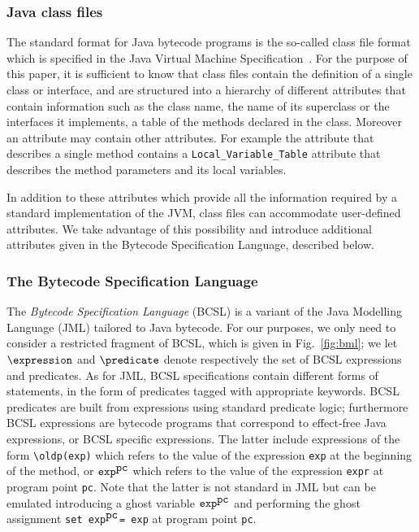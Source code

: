\subsubsection{Java class files} \label{classFileFormat}
The standard format for Java bytecode programs is the so-called class
file format which is specified in the Java Virtual Machine
Specification~\cite{VMSpec}. For the purpose of this paper, it is
sufficient to know that class files contain the definition of a single
class or interface, and are structured into a hierarchy of different
attributes that contain information such as the class name, the name
of its superclass or the interfaces it implements, a table of the
methods declared in the class. Moreover an attribute may contain other
attributes. For example the attribute that describes a single method
contains a \verb!Local_Variable_Table! attribute that describes the
method parameters and its local variables.

In addition to these attributes which provide all the information
required by a standard implementation of the JVM, class files can
accommodate user-defined attributes.  We take advantage of this
possibility and introduce additional attributes given in the Bytecode
Specification Language, described below.


\subsubsection{The Bytecode Specification Language}
The {\it Bytecode Specification Language} (BCSL) \cite{LM05:acc} is a
variant of the Java Modelling Language (JML) \cite{JMLRefMan} tailored
to Java bytecode. For our purposes, we only need to consider a
restricted fragment of BCSL, which is given in Fig.~\ref{fig:bml}; we
let $\expression$ and $\predicate$ denote respectively the set of BCSL
expressions and predicates. As for JML, BCSL specifications contain
different forms of statements, in the form of predicates tagged with
appropriate keywords. BCSL predicates are built from expressions using
standard predicate logic; furthermore BCSL expressions are bytecode
programs that correspond to effect-free Java expressions, or BCSL
specific expressions.  The latter include expressions of the form
\verb!\oldp(exp)! which refers to the value of the expression
\verb!exp! at the beginning of the method, or $\mbox{\tt
exp}^{\mbox{{\tt pc}}}$ which refers to the value of the expression
\verb!expr! at program point \verb!pc!. Note that the latter is not
standard in JML but can be emulated introducing a ghost variable
$\mbox{\tt exp}^{\mbox{{\tt pc}}}$ and performing the ghost assignment
\verb!set exp!$\mbox{}^{\mbox{{\tt pc}}}$\verb!= exp! at program point
\verb!pc!.


